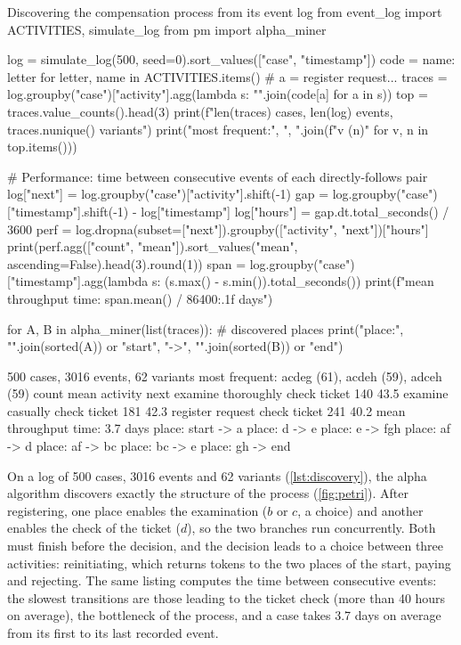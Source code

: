 \begin{pylisting}[label={lst:discovery}]{Discovering the compensation process from its event log}
from event_log import ACTIVITIES, simulate_log
from pm import alpha_miner

log = simulate_log(500, seed=0).sort_values(["case", "timestamp"])
code = {name: letter for letter, name in ACTIVITIES.items()}    # a = register request...
traces = log.groupby("case")["activity"].agg(lambda s: "".join(code[a] for a in s))
top = traces.value_counts().head(3)
print(f"{len(traces)} cases, {len(log)} events, {traces.nunique()} variants")
print("most frequent:", ", ".join(f"{v} ({n})" for v, n in top.items()))

# Performance: time between consecutive events of each directly-follows pair
log["next"] = log.groupby("case")["activity"].shift(-1)
gap = log.groupby("case")["timestamp"].shift(-1) - log["timestamp"]
log["hours"] = gap.dt.total_seconds() / 3600
perf = log.dropna(subset=["next"]).groupby(["activity", "next"])["hours"]
print(perf.agg(["count", "mean"]).sort_values("mean", ascending=False).head(3).round(1))
span = log.groupby("case")["timestamp"].agg(lambda s: (s.max() - s.min()).total_seconds())
print(f"mean throughput time: {span.mean() / 86400:.1f} days")

for A, B in alpha_miner(list(traces)):                          # discovered places
    print("place:", "".join(sorted(A)) or "start", "->", "".join(sorted(B)) or "end")
\end{pylisting}
\begin{pyoutput}
500 cases, 3016 events, 62 variants
most frequent: acdeg (61), acdeh (59), adceh (59)
                                 count  mean
activity           next                     
examine thoroughly check ticket    140  43.5
examine casually   check ticket    181  42.3
register request   check ticket    241  40.2
mean throughput time: 3.7 days
place: start -> a
place: d -> e
place: e -> fgh
place: af -> d
place: af -> bc
place: bc -> e
place: gh -> end
\end{pyoutput}

On a log of 500 cases, 3016 events and 62 variants (\cref{lst:discovery}), the alpha algorithm discovers
exactly the structure of the process (\cref{fig:petri}). After registering, one place enables the
examination ($b$ or $c$, a choice) and another enables the check of the ticket ($d$), so the two branches
run concurrently. Both must finish before the decision, and the decision leads to a choice between
three activities: reinitiating, which returns tokens to the two places of the start, paying and rejecting. The same
listing computes the time between consecutive events: the slowest transitions are those leading to the
ticket check (more than 40 hours on average), the bottleneck of the process, and a case takes 3.7 days
on average from its first to its last recorded event.

